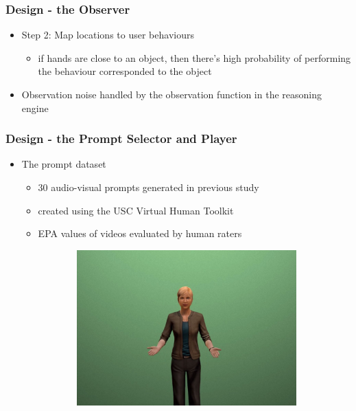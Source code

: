 \documentclass{beamer}
\begin{document}
\begin{frame}
\frametitle{Design - the Observer}
\begin{itemize}
\item Step 2: Map locations to user behaviours
\begin{itemize}
\item if hands are close to an object, then there's high probability of performing the behaviour corresponded to the object
\end{itemize}
\vspace{.3cm}
\item Observation noise handled by the observation function in the reasoning engine
\end{itemize}
\end{frame}

\begin{frame}
\frametitle{Design - the Prompt Selector and Player}
\begin{itemize}
\item The prompt dataset 
\begin{itemize}
\item 30 audio-visual prompts generated in previous study
\item created using the USC Virtual Human Toolkit
\item EPA values of videos evaluated by human raters
\end{itemize}
\begin{figure}[htb]
\centering
\begin{subfigure}[b]{.4\textwidth}
\includegraphics[width=\textwidth]{fig/prompt1.jpg}

\end{subfigure}
\end{figure}
\end{itemize}
\end{frame}
\end{document}
